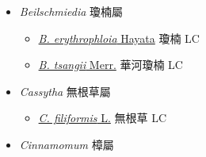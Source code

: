 
  \begin{itemize}
 \item[] \textit{Beilschmiedia} 瓊楠屬
                                
  \begin{itemize}
        \item[] \href{http://www.theplantlist.org/tpl1.1/search?q=Beilschmiedia+erythrophloia}{\textit{B. erythrophloia} Hayata}   瓊楠   LC
        \item[] \href{http://www.theplantlist.org/tpl1.1/search?q=Beilschmiedia+tsangii}{\textit{B. tsangii} Merr.}   華河瓊楠   LC
  \end{itemize}
 \item[] \textit{Cassytha} 無根草屬
                                
  \begin{itemize}
        \item[] \href{http://www.theplantlist.org/tpl1.1/search?q=Cassytha+filiformis}{\textit{C. filiformis} L.}   無根草   LC
  \end{itemize}
 \item[] \textit{Cinnamomum} 樟屬
                                

\end{itemize}
